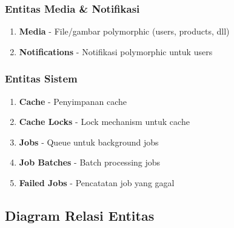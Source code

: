 \documentclass[12pt,a4paper]{article}
\begin{document}
\subsubsection{Entitas Media \& Notifikasi}
\begin{enumerate}
    \item \textbf{Media} - File/gambar polymorphic (users, products, dll)
    \item \textbf{Notifications} - Notifikasi polymorphic untuk users
\end{enumerate}

\subsubsection{Entitas Sistem}
\begin{enumerate}
    \item \textbf{Cache} - Penyimpanan cache
    \item \textbf{Cache Locks} - Lock mechanism untuk cache
    \item \textbf{Jobs} - Queue untuk background jobs
    \item \textbf{Job Batches} - Batch processing jobs
    \item \textbf{Failed Jobs} - Pencatatan job yang gagal
\end{enumerate}

\subsection{Diagram Relasi Entitas}
\end{document}
